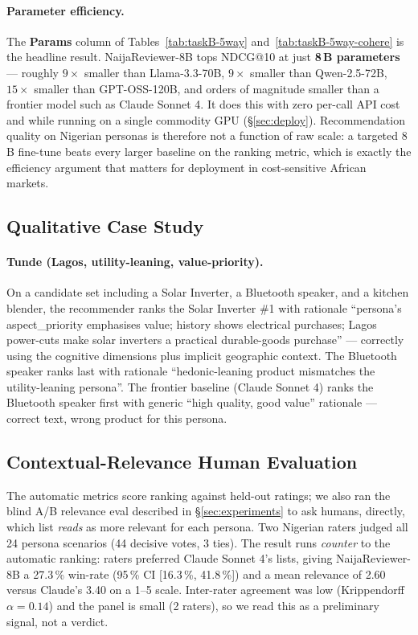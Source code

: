\documentclass[sigconf,nonacm,balance]{acmart}
\begin{document}
\paragraph{Parameter efficiency.} The \textbf{Params} column of
Tables~\ref{tab:taskB-5way} and~\ref{tab:taskB-5way-cohere} is the headline
result. NaijaReviewer-8B tops NDCG@10 at just \textbf{8\,B parameters} ---
roughly $9\times$ smaller than Llama-3.3-70B, $9\times$ smaller than
Qwen-2.5-72B, $15\times$ smaller than GPT-OSS-120B, and orders of magnitude
smaller than a frontier model such as Claude Sonnet 4. It does this with zero
per-call API cost and while running on a single commodity GPU
(\S\ref{sec:deploy}). Recommendation quality on Nigerian personas is therefore
not a function of raw scale: a targeted 8\,B fine-tune beats every larger
baseline on the ranking metric, which is exactly the efficiency argument that
matters for deployment in cost-sensitive African markets.

\subsection{Qualitative Case Study}

\paragraph{Tunde (Lagos, utility-leaning, value-priority).}
On a candidate set including a Solar Inverter, a Bluetooth speaker, and
a kitchen blender, the recommender ranks the Solar Inverter \#1 with
rationale ``persona's \textsf{aspect\_priority} emphasises value; history
shows electrical purchases; Lagos power-cuts make solar inverters a
practical durable-goods purchase'' --- correctly using the cognitive
dimensions plus implicit geographic context. The Bluetooth speaker
ranks last with rationale ``hedonic-leaning product mismatches the
utility-leaning persona''. The frontier baseline (Claude Sonnet 4)
ranks the Bluetooth speaker first with generic ``high quality, good
value'' rationale --- correct text, wrong product for this persona.

\subsection{Contextual-Relevance Human Evaluation}
\label{sec:taskb-humaneval}
The automatic metrics score ranking against held-out ratings; we also ran the
blind A/B relevance eval described in \S\ref{sec:experiments} to ask humans,
directly, which list \emph{reads} as more relevant for each persona. Two
Nigerian raters judged all 24 persona scenarios (44 decisive votes, 3 ties).
The result runs \emph{counter} to the automatic ranking: raters preferred
Claude Sonnet 4's lists, giving NaijaReviewer-8B a 27.3\,\% win-rate
(95\,\% CI [16.3\,\%, 41.8\,\%]) and a mean relevance of 2.60 versus Claude's
3.40 on a 1--5 scale. Inter-rater agreement was low (Krippendorff
$\alpha = 0.14$) and the panel is small (2 raters), so we read this as a
preliminary signal, not a verdict.
\end{document}
